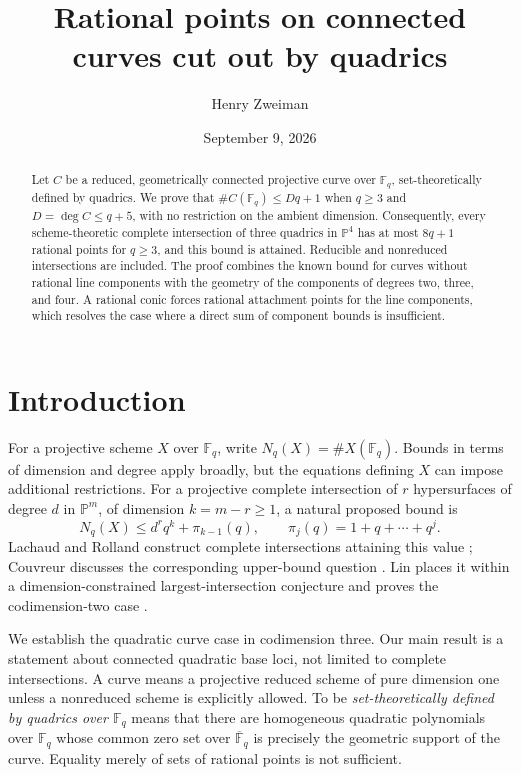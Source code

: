 \documentclass[11pt]{article}
\title{Rational points on connected curves cut out by quadrics}
\author{Henry Zweiman}
\date{September 9, 2026}
\theoremstyle{remark}\newtheorem{remark}[theorem]{Remark}
\newcommand{\F}{\mathbb F}
\newcommand{\PP}{\mathbb P}
\newcommand{\Nq}{N_q}
\begin{document}
\maketitle
\begin{abstract}
Let $C$ be a reduced, geometrically connected projective curve over $\F_q$, set-theoretically defined by quadrics. We prove that $\#C(\F_q)\le Dq+1$ when $q\ge3$ and $D=\deg C\le q+5$, with no restriction on the ambient dimension. Consequently, every scheme-theoretic complete intersection of three quadrics in $\PP^4$ has at most $8q+1$ rational points for $q\ge3$, and this bound is attained. Reducible and nonreduced intersections are included. The proof combines the known bound for curves without rational line components with the geometry of the components of degrees two, three, and four. A rational conic forces rational attachment points for the line components, which resolves the case where a direct sum of component bounds is insufficient.
\end{abstract}

\section{Introduction}
For a projective scheme $X$ over $\F_q$, write $\Nq(X)=\#X(\F_q)$. Bounds in terms of dimension and degree apply broadly, but the equations defining $X$ can impose additional restrictions. For a projective complete intersection of $r$ hypersurfaces of degree $d$ in $\PP^m$, of dimension $k=m-r\ge1$, a natural proposed bound is
\begin{equation}\label{eq:conjectural}
 \Nq(X)\le d^r q^k+\pi_{k-1}(q),
 \qquad \pi_j(q)=1+q+\cdots+q^j.
\end{equation}
Lachaud and Rolland construct complete intersections attaining this value \cite{LR}; Couvreur discusses the corresponding upper-bound question \cite[Section 5.3]{Couvreur}. Lin places it within a dimension-constrained largest-intersection conjecture and proves the codimension-two case \cite[Conjecture 1.5 and Theorem 1.8]{Lin}.

We establish the quadratic curve case in codimension three. Our main result is a statement about connected quadratic base loci, not limited to complete intersections. A curve means a projective reduced scheme of pure dimension one unless a nonreduced scheme is explicitly allowed. To be \emph{set-theoretically defined by quadrics over $\F_q$} means that there are homogeneous quadratic polynomials over $\F_q$ whose common zero set over $\overline{\F}_q$ is precisely the geometric support of the curve. Equality merely of sets of rational points is not sufficient.
\end{document}
